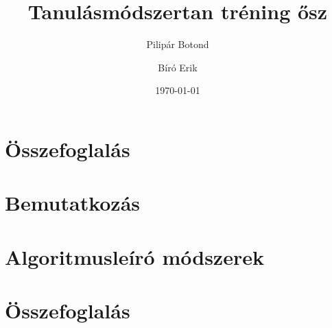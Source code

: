 \documentclass[12pt]{article}
\title{Tanulásmódszertan tréning ősz}
\author{Pilipár Botond}
\author{Bíró Erik}
\date{\today}
\begin{document}


\tableofcontents

\section*{Összefoglalás}


\section{Bemutatkozás}


\section{Algoritmusleíró módszerek}


\section{Összefoglalás}

\end{document}
